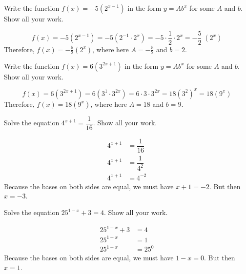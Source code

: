 \documentclass[11pt,letterpaper]{article}
\begin{document}

 Write the function $f(x)= -5(2^{x-1})$ in the form $y= Ab^x$ for some $A$ and $b$. Show all your work. \pspace

\sol 
	\[
	f(x)= -5(2^{x-1})= -5(2^{-1} \cdot 2^x)= -5 \cdot \dfrac{1}{2} \cdot 2^x= -\frac{5}{2}\; (2^x)
	\] \pspace
Therefore, $f(x)= -\frac{5}{2} (2^x)$, where here $A= -\frac{5}{2}$ and $b= 2$. 





\newpage





 Write the function $f(x)= 6(3^{2x+1})$ in the form $y= Ab^x$ for some $A$ and $b$. Show all your work. \pspace

\sol 
	\[
	f(x)= 6(3^{2x+1})= 6(3^1 \cdot 3^{2x})= 6 \cdot 3 \cdot 3^{2x}= 18 (3^2)^x= 18(9^x)
	\] \pspace
Therefore, $f(x)= 18(9^x)$, where here $A= 18$ and $b= 9$. 





\newpage





 Solve the equation $4^{x+1}= \dfrac{1}{16}$. Show all your work. \pspace

\sol
	\[
	\begin{aligned}
	4^{x + 1}&= \dfrac{1}{16} \\[0.3cm]
	4^{x + 1}&= \dfrac{1}{4^2} \\[0.3cm] 
	4^{x + 1}&= 4^{-2}
	\end{aligned}
	\] \pspace
Because the bases on both sides are equal, we must have $x + 1= -2$. But then $x= -3$. 





\newpage





 Solve the equation $25^{1-x} + 3= 4$. Show all your work. \pspace

\sol
	\[
	\begin{aligned}
	25^{1-x} + 3&= 4 \\[0.3cm]
	25^{1 - x}&= 1 \\[0.3cm]
	25^{1 - x}&= 25^0
	\end{aligned}
	\] \pspace
Because the bases on both sides are equal, we must have $1 - x= 0$. But then $x= 1$. 


\end{document}
